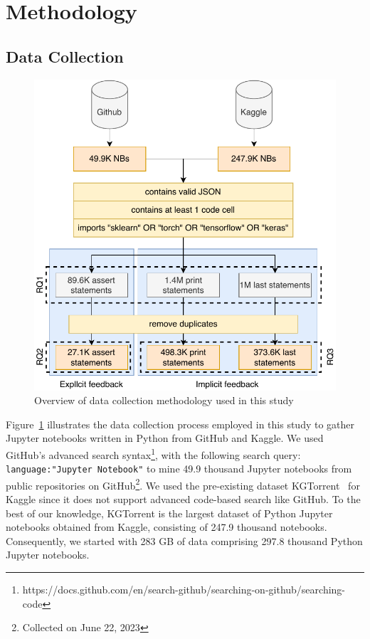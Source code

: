 \section{Methodology}

\subsection{Data Collection}\label{sec:data-collect}

\begin{figure}
  \centering
  \includegraphics[width=0.75\linewidth]{data-collection.pdf}
  \caption{Overview of data collection methodology used in this study}
  \label{fig:data-collection}
\end{figure}

Figure~\ref{fig:data-collection} illustrates the data collection process employed in this study to gather Jupyter notebooks written in Python from GitHub and Kaggle. We used GitHub's advanced search syntax\footnote{https://docs.github.com/en/search-github/searching-on-github/searching-code}, with the following search query: \lstinline[language={}]$language:"Jupyter Notebook"$ to mine 49.9 thousand Jupyter notebooks from public repositories on GitHub\footnote{Collected on June 22, 2023}. We used the pre-existing dataset KGTorrent~\cite{quaranta2021kgtorrent} for Kaggle since it does not support advanced code-based search like GitHub. To the best of our knowledge, KGTorrent is the largest dataset of Python Jupyter notebooks obtained from Kaggle, consisting of 247.9 thousand notebooks. Consequently, we started with 283 GB of data comprising 297.8 thousand Python Jupyter notebooks.

